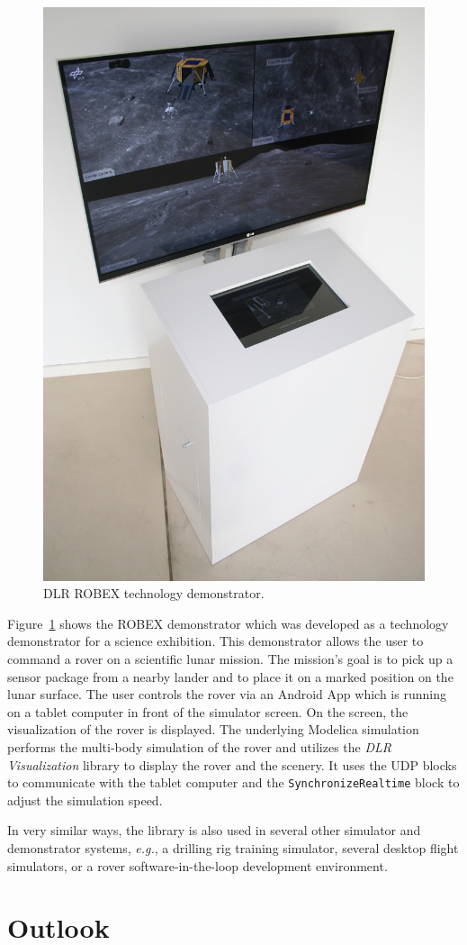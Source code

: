 \documentclass{resources/modelica}
\newcommand{\modelica}[1]{\lstinline[language=modelica]|#1|}
\newcommand{\BTHI}[1]{}
\newcommand{\TBEU}[1]{}
\begin{document}
\begin{figure}[htb]
  \centering
  \includegraphics[width=0.5\columnwidth]{figures/DLRROBEX}
  \caption{DLR ROBEX technology demonstrator.}
  \label{fig:DLRROBEX}
\end{figure}
\TBEU{Tobias: Do you have any citable references for the application or exhibition?}
Figure~\ref{fig:DLRROBEX} shows the ROBEX demonstrator which was developed as a technology demonstrator
for a science exhibition.
This demonstrator allows the user to command a rover
on a scientific lunar mission. The mission's goal is to pick up a sensor package from a nearby
lander and to place it on a marked position on the lunar surface. The user
controls the rover via an Android App which is running on a tablet computer in front of
the simulator screen.
\TBEU{Bernhard: Add link to Android in footnote?}On the screen, the visualization of the rover is displayed.
The underlying Modelica simulation performs the multi-body simulation of the
rover and utilizes the \emph{DLR Visualization} library to display the rover and the
scenery.
\TBEU{Tobias: Is the Android App open-source and can be added as link in a footnote?}It uses the UDP blocks to communicate with the tablet computer and the
\modelica{SynchronizeRealtime} block to adjust the simulation speed.

In very similar ways, the library is also used in several other simulator and
demonstrator systems, \textit{e.g.}, a drilling rig training simulator, several
desktop flight simulators, or a rover software-in-the-loop development
environment.

\section{Outlook}
\BTHI{TODO: Bernhard, Thomas, Volker}
\end{document}
